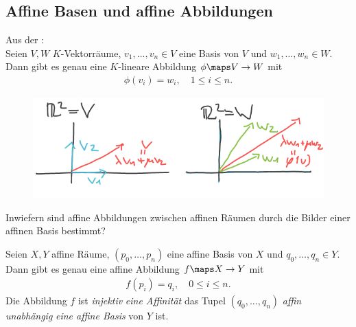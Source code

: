 \subsection*{Affine Basen und affine Abbildungen}
Aus der :\\
Seien \( V,W \) \( K \)-Vektorräume, \( v_1,\dotsc, v_n \in V \) eine Basis von \( V \) und \( w_1,\dotsc, w_n \in W\). Dann gibt es genau eine \( K \)-lineare Abbildung \( \phi\maps V\to W \) mit
\begin{align*}
    \phi(v_i)=w_i,\quad 1\leq i \leq n.
\end{align*}
\begin{figure}[H]
    \centering
    \includegraphics[width=0.7\linewidth]{figures/bilder_der_basen_bestimmt_abbildung_r_2}
    \label{fig:bilder_der_basen_bestimmt_abbildung_r_2}
\end{figure}
\begin{frage*}
    Inwiefern sind affine Abbildungen zwischen affinen Räumen durch die Bilder einer affinen Basis bestimmt?
\end{frage*}
\begin{satz}\label{bilder_der_basen_bestimmen_affine_abbildung}
    Seien \( X,Y \) affine Räume, \( (p_0,\dotsc,p_n) \) eine affine Basis von \( X \) und \( q_0,\dotsc, q_n\in Y \). Dann gibt es genau eine affine Abbildung \( f\maps X\to Y \) mit
    \begin{align*}
        f(p_i)=q_i,\quad 0\leq i\leq n.
    \end{align*}
    Die Abbildung \( f \) ist \emph{injektiv} \bzw \emph{eine Affinität} \gdw das Tupel \( (q_0,\dotsc, q_n) \) \emph{affin unabhängig} \bzw \emph{eine affine Basis} von \( Y \) ist.
\end{satz}
